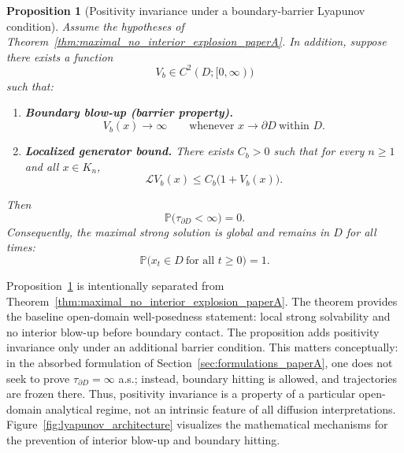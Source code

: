 \documentclass[pdflatex,sn-mathphys-ay]{sn-jnl}
\theoremstyle{thmstyleone}
\newtheorem{proposition}[theorem]{Proposition}
\theoremstyle{definition}
\theoremstyle{remark}
\begin{document}
\begin{proposition}[Positivity invariance under a boundary-barrier Lyapunov condition]
\label{prop:barrier_invariance_paperA}
Assume the hypotheses of Theorem~\ref{thm:maximal_no_interior_explosion_paperA}. In addition, suppose there exists a function
\[
V_b\in C^2(D;[0,\infty))
\]
such that:
\begin{enumerate}[label=\textbf{(B\arabic*)},leftmargin=2.2em]
\item \textbf{Boundary blow-up (barrier property).}
\begin{equation}
\label{eq:barrier_blowup_paperA}
V_b(x)\to\infty\qquad \text{whenever }x\to\partial D\ \text{within }D.
\end{equation}
\item \textbf{Localized generator bound.} There exists \(C_b>0\) such that for every \(n\ge1\) and all \(x\in K_n\),
\begin{equation}
\label{eq:barrier_generator_bound_paperA}
\mathcal L V_b(x)\le C_b\bigl(1+V_b(x)\bigr).
\end{equation}
\end{enumerate}
Then
\begin{equation}
\label{eq:no_boundary_hitting_paperA}
\mathbb P\bigl(\tau_{\partial D}<\infty\bigr)=0.
\end{equation}
Consequently, the maximal strong solution is global and remains in \(D\) for all times:
\begin{equation}
\label{eq:D_invariance_corrected_paperA}
\mathbb P\bigl(x_t\in D\ \text{for all }t\ge0\bigr)=1.
\end{equation}
\end{proposition}

Proposition~\ref{prop:barrier_invariance_paperA} is intentionally separated from Theorem~\ref{thm:maximal_no_interior_explosion_paperA}. The theorem provides the baseline open-domain well-posedness statement: local strong solvability and no interior blow-up before boundary contact. The proposition adds positivity invariance only under an additional barrier condition. This matters conceptually: in the absorbed formulation of Section~\ref{sec:formulations_paperA}, one does not seek to prove \(\tau_{\partial D}=\infty\) a.s.; instead, boundary hitting is allowed, and trajectories are frozen there. Thus, positivity invariance is a property of a particular open-domain analytical regime, not an intrinsic feature of all diffusion interpretations. Figure~\ref{fig:lyapunov_architecture} visualizes the mathematical mechanisms for the prevention of interior blow-up and boundary hitting.
\end{document}
